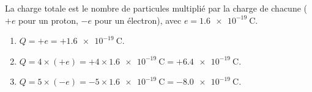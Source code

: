 \documentclass[11pt,a4paper]{article}
\begin{document}
\begin{corrige}
La charge totale est le nombre de particules multiplié par la charge de chacune ($+e$ pour un proton,
$-e$ pour un électron), avec $e = \SI{1,6e-19}{\coulomb}$.
\begin{enumerate}[label=\alph*)]
  \item $Q = +e = +\SI{1,6e-19}{\coulomb}$.
  \item $Q = 4 \times (+e) = +4 \times \SI{1,6e-19}{\coulomb} = +\SI{6,4e-19}{\coulomb}$.
  \item $Q = 5 \times (-e) = -5 \times \SI{1,6e-19}{\coulomb} = -\SI{8,0e-19}{\coulomb}$.
\end{enumerate}
\end{corrige}
\end{document}
